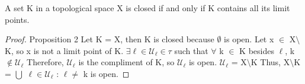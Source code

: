 \documentclass{article}
\begin{document}
	\begin{proposition}
		A set K in a topological space X is closed if and only if K contains all its limit points.
	\end{proposition}
	\begin{proof}
	Proposition 2
	\newline
	Let K = X, then K is closed because $\emptyset$ is open.
	\newline
	Let x $\in$ X$\setminus$K, so x is not a limit point of K.
	\newline
	$\exists \ell \in \mathcal{U}_\ell \in \tau$ such that $\forall$ k $\in$ K besides $\ell$, k $\not\in \mathcal{U}_\ell$
	\newline
	Therefore, $\mathcal{U}_\ell$ is the compliment of K, so $\mathcal{U}_\ell$ is open.
	\newline
	$\mathcal{U}_\ell$ = X$\setminus$K
	\newline
	Thus, X$\setminus$K = $\bigcup$ { $\ell \in \mathcal{U}_\ell$ : $\ell \neq$ k } is open. 
	\end{proof}
\end{document}

